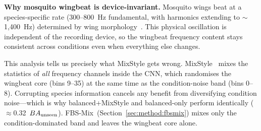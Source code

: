 \textbf{Why mosquito wingbeat is device-invariant.}
Mosquito wings beat at a species-specific rate (300--800~Hz
fundamental, with harmonics extending to $\sim$1{,}400~Hz)
determined by wing morphology~\cite{mukundarajan2017}.
This physical oscillation is independent of the recording device, so
the wingbeat frequency content stays consistent across conditions even
when everything else changes.

This analysis tells us precisely what MixStyle gets wrong.
MixStyle~\cite{mixstyle2021} mixes the statistics of \emph{all}
frequency channels inside the CNN, which randomises the wingbeat
core (bins 9--35) at the same time as the condition-noise band
(bins 0--8).
Corrupting species information cancels any benefit from diversifying
condition noise---which is why balanced+MixStyle and balanced-only
perform identically ($\approx$0.32~$BA_{\text{unseen}}$).
FBS-Mix~(Section~\ref{sec:method:fbsmix}) mixes only the
condition-dominated band and leaves the wingbeat core alone.
